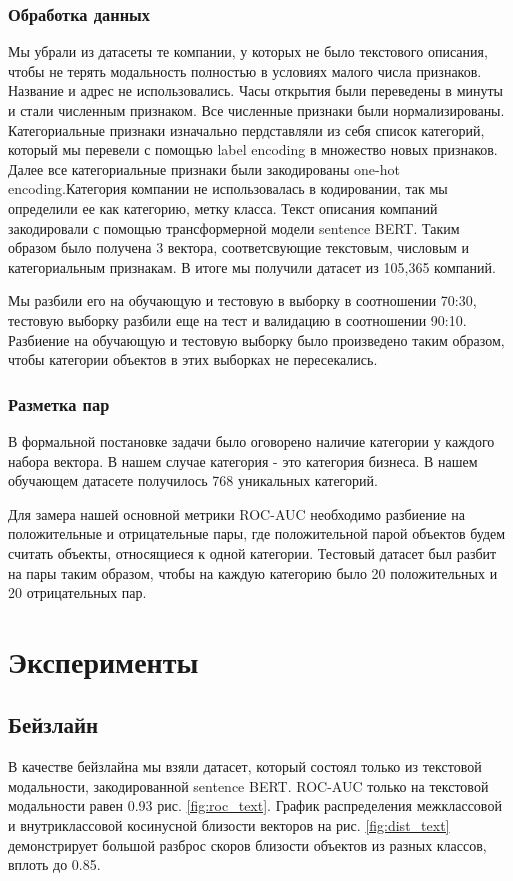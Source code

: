 \documentclass{article}
\begin{document}
\subsubsection{Обработка данных}
 Мы убрали из датасеты те компании, у которых не было текстового описания, чтобы не терять модальность полностью в условиях малого числа признаков. Название и адрес не использовались. Часы открытия были переведены в минуты и стали численным признаком. Все численные признаки были нормализированы. Категориальные признаки изначально пердставляли из себя список категорий, который мы перевели с помощью label encoding в множество новых признаков. Далее все категориальные признаки были закодированы one-hot encoding.Категория компании не использовалась в кодировании, так мы определили ее как категорию, метку класса. Текст описания компаний закодировали с помощью трансформерной модели sentence BERT. Таким образом было получена 3 вектора, соответсвующие текстовым, числовым и категориальным признакам.
В итоге мы получили датасет из 105,365 компаний. 
\par Мы разбили его на обучающую и тестовую в выборку в соотношении 70:30, тестовую выборку разбили еще на тест и валидацию в соотношении 90:10. Разбиение на обучающую и тестовую выборку было произведено таким образом, чтобы категории объектов в этих выборках не пересекались.
 \subsubsection{Разметка пар}
\par В формальной постановке задачи было оговорено наличие категории у каждого набора вектора. В нашем случае категория - это категория бизнеса. В нашем обучающем датасете получилось 768 уникальных категорий.
\par Для замера нашей основной метрики ROC-AUC необходимо разбиение на положительные и отрицательные пары, где положительной парой объектов будем считать объекты, относящиеся к одной категории. Тестовый датасет был разбит на пары таким образом, чтобы на каждую категорию было 20 положительных и 20 отрицательных пар. 

\section{Эксперименты}
\subsection{Бейзлайн}
В качестве бейзлайна мы взяли датасет, который состоял только из текстовой модальности, закодированной sentence BERT. ROC-AUC только на текстовой модальности равен 0.93  рис. \ref{fig:roc_text}. График распределения межклассовой и внутриклассовой косинусной близости векторов на рис. \ref{fig:dist_text} демонстрирует большой разброс скоров близости объектов из разных классов, вплоть до 0.85. 
\end{document}
